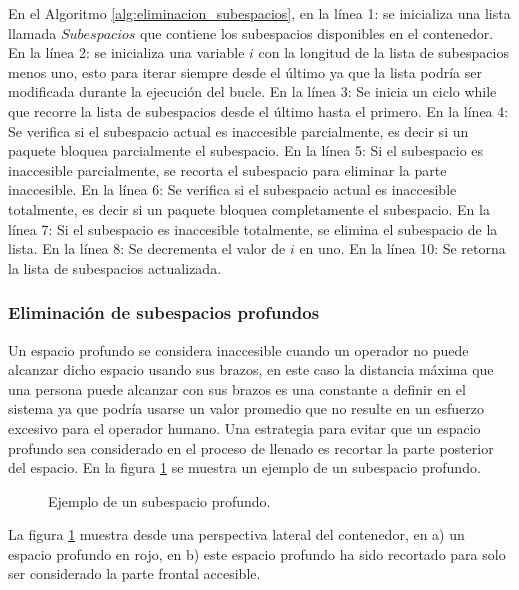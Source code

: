\documentclass[openany]{article}
\begin{document}
En el Algoritmo \ref{alg:eliminacion_subespacios}, en la línea 1: se inicializa una lista llamada $Subespacios$ que contiene los subespacios disponibles en el contenedor. En la línea 2: se inicializa una variable $i$ con la longitud de la lista de subespacios menos uno, esto para iterar siempre desde el último ya que la lista podría ser modificada durante la ejecución del bucle. En la línea 3: Se inicia un ciclo while que recorre la lista de subespacios desde el último hasta el primero. En la línea 4: Se verifica si el subespacio actual es inaccesible parcialmente, es decir si un paquete bloquea parcialmente el subespacio. En la línea 5: Si el subespacio es inaccesible parcialmente, se recorta el subespacio para eliminar la parte inaccesible. En la línea 6: Se verifica si el subespacio actual es inaccesible totalmente, es decir si un paquete bloquea completamente el subespacio. En la línea 7: Si el subespacio es inaccesible totalmente, se elimina el subespacio de la lista. En la línea 8: Se decrementa el valor de $i$ en uno. En la línea 10: Se retorna la lista de subespacios actualizada.

\subsubsection{Eliminación de subespacios profundos}

Un espacio profundo se considera inaccesible cuando un operador no puede alcanzar dicho espacio usando sus brazos, en este caso la distancia máxima que una persona puede alcanzar con sus brazos es una constante a definir en el sistema ya que podría usarse un valor promedio que no resulte en un esfuerzo excesivo para el operador humano. Una estrategia para evitar que un espacio profundo sea considerado en el proceso de llenado es recortar la parte posterior del espacio. En la figura \ref{fig:subespacio_profundo} se muestra un ejemplo de un subespacio profundo.

\begin{figure}[H]
    \centering
    
    \caption{Ejemplo de un subespacio profundo.}
    \label{fig:subespacio_profundo}
\end{figure}

La figura \ref{fig:subespacio_profundo} muestra desde una perspectiva lateral del contenedor, en a) un espacio profundo en rojo, en b) este espacio profundo ha sido recortado para solo ser considerado la parte frontal accesible.
\end{document}

